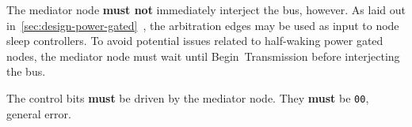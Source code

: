 The mediator node {\bf must not} immediately interject the bus, however. As
laid out in~\ref{sec:design-power-gated}~, the
arbitration edges may be used as input to node sleep controllers. To avoid
potential issues related to half-waking power gated nodes, the mediator node
must wait until Begin~Transmission before interjecting the bus.

The control bits {\bf must} be driven by the mediator node. They {\bf must} be
{\tt 00}, general error.
